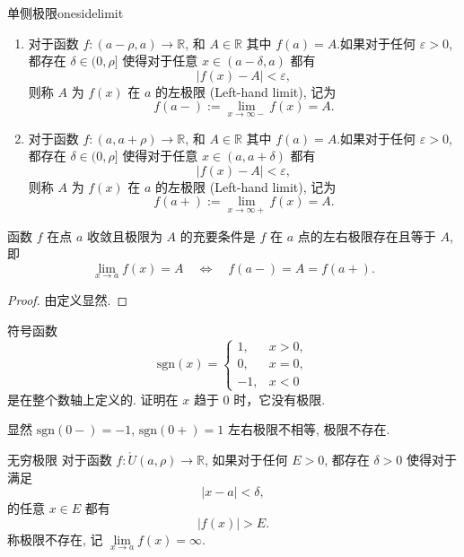 \documentclass[cn,toc=twocol]{elegantbook}
\newcommand{\ITEMS}{\begin{enumerate}}
\newcommand{\ITEME}{\end{enumerate}}
\newcommand{\R}{\mathbb{R}}
\begin{document}
\begin{definition}{单侧极限}{onesidelimit}
\ITEMS
	\item 对于函数 $f: (a-\rho,a) \rightarrow \R$, 和 $A\in\R$ 其中 $f(a) = A$.如果对于任何 $\varepsilon > 0$, 都存在 $\delta \in (0,\rho]$ 使得对于任意 $x \in (a-\delta,a)$ 都有
	\[
		\lvert f(x) - A \rvert < \varepsilon,
	\] 
	则称 $A$ 为 $f(x)$ 在 $a$ 的左极限 (Left-hand limit), 记为
	\[
		f(a-) := \lim_{x\to\infty-} f(x) = A.
	\]
	\smallskip

	\item 对于函数 $f: (a,a+\rho) \rightarrow \R$, 和 $A\in\R$ 其中 $f(a) = A$.如果对于任何 $\varepsilon > 0$, 都存在 $\delta \in (0,\rho]$ 使得对于任意 $x \in (a,a+\delta)$ 都有
	\[
		\lvert f(x) - A \rvert < \varepsilon,
	\] 
	则称 $A$ 为 $f(x)$ 在 $a$ 的左极限 (Left-hand limit), 记为
	\[
		f(a+) := \lim_{x\to\infty+} f(x) = A.
	\]

\ITEME
\end{definition}


\begin{theorem}
	函数 $f$ 在点 $a$ 收敛且极限为 $A$ 的充要条件是 $f$ 在 $a$ 点的左右极限存在且等于 $A$, 即
	\[
	\lim_{x\to a} f(x) = A\quad \iff\quad f(a-) = A = f(a+).
	\]
\end{theorem}

\begin{proof}
	由定义显然.
\end{proof}


\begin{example}
	符号函数
	\[
		\mathrm{sgn} (x) = \begin{cases}
			1, & x>0,\\
			0, & x=0,\\
			-1, & x<0
		\end{cases}
	\]
	是在整个数轴上定义的. 证明在 $x$ 趋于 $0$ 时，它没有极限.
\end{example}

\begin{solution}
	显然 $\mathrm{sgn} (0-) = -1$, $\mathrm{sgn} (0+) = 1$ 左右极限不相等, 极限不存在.
\end{solution}

\begin{definition}{无穷极限}
对于函数 $f:\mathring{U}(a,\rho) \rightarrow \R$, 如果对于任何 $E > 0$, 都存在 $\delta > 0$ 使得对于满足 
\[
	\lvert x - a \rvert < \delta,
\] 
的任意 $x \in E$ 都有
\[
	\lvert f(x) \rvert > E.
\] 
称极限不存在, 记 $\lim\limits_{x\to a} f(x) = \infty$.
\end{definition}
\end{document}
